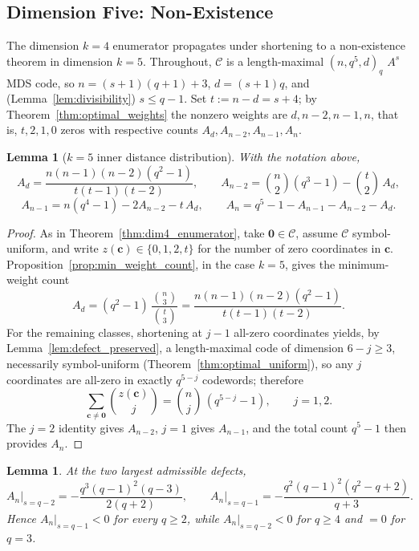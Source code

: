 \documentclass[12pt, letterpaper]{article}
\theoremstyle{plain}
\newtheorem{lemma}[theorem]{Lemma}
\theoremstyle{definition}
\begin{document}
	\subsection{Dimension Five: Non-Existence}
	\label{sec:dim5}

	The dimension $k=4$ enumerator propagates under shortening to a non-existence theorem in dimension $k=5$. Throughout, $\mathcal C$ is a length-maximal $(n,q^5,d)_q$ $A^s$MDS code, so $n = (s+1)(q+1)+3$, $d = (s+1)q$, and (Lemma~\ref{lem:divisibility}) $s \le q-1$. Set $t := n-d = s+4$; by Theorem~\ref{thm:optimal_weights} the nonzero weights are $d, n-2, n-1, n$, that is, $t, 2, 1, 0$ zeros with respective counts $A_d, A_{n-2}, A_{n-1}, A_n$.

	\begin{lemma}[$k=5$ inner distance distribution]\label{lem:dim5_enumerator}
		With the notation above,
		\[
		A_d = \frac{n(n-1)(n-2)(q^2-1)}{t(t-1)(t-2)}, \qquad
		A_{n-2} = \binom n2(q^3-1) - \binom t2\,A_d,
		\]
		\[
		A_{n-1} = n(q^4-1) - 2A_{n-2} - t\,A_d, \qquad
		A_n = q^5-1 - A_{n-1} - A_{n-2} - A_d.
		\]
	\end{lemma}

	\begin{proof}
		As in Theorem~\ref{thm:dim4_enumerator}, take $\mathbf 0 \in \mathcal C$, assume $\mathcal C$ symbol-uniform, and write $z(\mathbf c) \in \{0,1,2,t\}$ for the number of zero coordinates in $\mathbf c$. Proposition~\ref{prop:min_weight_count}, in the case $k=5$, gives the minimum-weight count
		\[
		A_d = (q^2-1)\,\frac{\binom n3}{\binom t3} = \frac{n(n-1)(n-2)(q^2-1)}{t(t-1)(t-2)}.
		\]
		For the remaining classes, shortening at $j-1$ all-zero coordinates yields, by Lemma~\ref{lem:defect_preserved}, a length-maximal code of dimension $6-j \ge 3$, necessarily symbol-uniform (Theorem~\ref{thm:optimal_uniform}), so any $j$ coordinates are all-zero in exactly $q^{5-j}$ codewords; therefore
		\[
		\sum_{\mathbf c \ne \mathbf 0}\binom{z(\mathbf c)}{j} = \binom nj\,(q^{5-j}-1), \qquad j=1,2.
		\]
		The $j=2$ identity gives $A_{n-2}$, $j=1$ gives $A_{n-1}$, and the total count $q^5-1$ then provides $A_n$.
	\end{proof}

	\begin{lemma}\label{lem:dim5_critical}
		At the two largest admissible defects,
		\[
		A_n\big|_{s=q-2} = -\frac{q^3(q-1)^2(q-3)}{2(q+2)}, \qquad
		A_n\big|_{s=q-1} = -\frac{q^2(q-1)^2(q^2-q+2)}{q+3}.
		\]
		Hence $A_n|_{s=q-1} < 0$ for every $q \ge 2$, while $A_n|_{s=q-2} < 0$ for $q \ge 4$ and $= 0$ for $q = 3$.
	\end{lemma}
\end{document}
